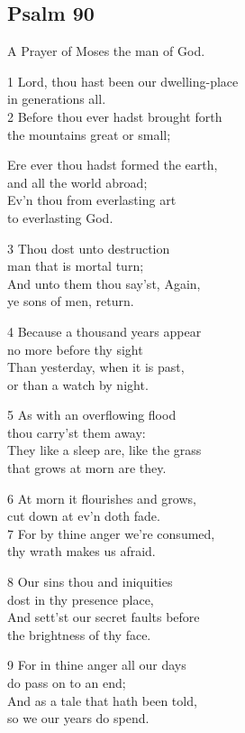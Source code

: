\subsection*{Psalm 90}

A Prayer of Moses the man of God.

1 Lord, thou hast been our dwelling-place\\
in generations all.\\
2 Before thou ever hadst brought forth\\
the mountains great or small;

Ere ever thou hadst formed the earth,\\
and all the world abroad;\\
Ev’n thou from everlasting art\\
to everlasting God.

3 Thou dost unto destruction\\
man that is mortal turn;\\
And unto them thou say’st, Again,\\
ye sons of men, return.

4 Because a thousand years appear\\
no more before thy sight\\
Than yesterday, when it is past,\\
or than a watch by night.

5 As with an overflowing flood\\
thou carry’st them away:\\
They like a sleep are, like the grass\\
that grows at morn are they.

6 At morn it flourishes and grows,\\
cut down at ev’n doth fade.\\
7 For by thine anger we’re consumed,\\
thy wrath makes us afraid.

8 Our sins thou and iniquities\\
dost in thy presence place,\\
And sett’st our secret faults before\\
the brightness of thy face.

9 For in thine anger all our days\\
do pass on to an end;\\
And as a tale that hath been told,\\
so we our years do spend.

